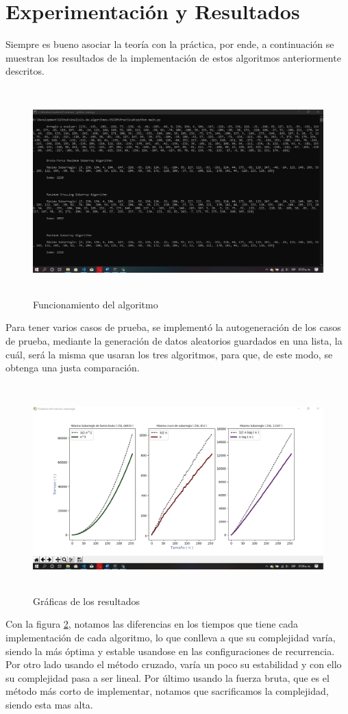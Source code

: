 \documentclass[12pt,twoside]{article}
\begin{document}
\section{Experimentaci\'on y Resultados}
Siempre es bueno asociar la teoría con la pr\'actica, por ende, a continuación se muestran los resultados de la implementaci\'on de estos algoritmos anteriormente descritos.
\begin{figure}
    \centering
    \includegraphics[width=13cm, height=8cm]{console.png}
    \caption{Funcionamiento del algoritmo}
    \label{fig:algoritmo}
\end{figure}

Para tener varios casos de prueba, se implement\'o la autogeneración de los casos de prueba, mediante la generaci\'on de datos aleatorios guardados en una lista, la cu\'al, ser\'a la misma que usaran los tres algoritmos, para que, de este modo, se obtenga una justa comparación.
\newline \newline

\begin{figure}
    \centering
    \includegraphics[width=15cm, height=8cm]{result.png}
    \caption{Gr\'aficas de los resultados}
    \label{fig:resultado}
\end{figure}
Con la figura \ref{fig:resultado}, notamos las diferencias en los tiempos que tiene cada implementación de cada algoritmo, lo que conlleva a que su complejidad varía, siendo la m\'as \'optima y estable usandose en las configuraciones de recurrencia. Por otro lado usando el m\'etodo cruzado, var\'ia un poco su estabilidad y con ello su complejidad pasa a ser lineal.
Por \'ultimo usando la fuerza bruta, que es el m\'etodo m\'as corto de implementar, notamos que sacrificamos la complejidad, siendo esta mas alta.
\end{document}
